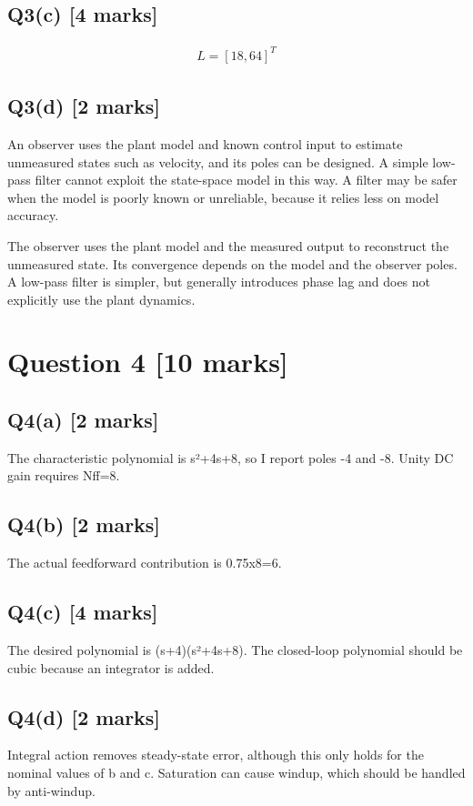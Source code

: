 \documentclass[11pt,a4paper]{article}
\begin{document}
\subsection*{Q3(c) \hfill [4 marks]}

\[\begin{aligned}L = [18,64]^T\end{aligned}\]

\subsection*{Q3(d) \hfill [2 marks]}

An observer uses the plant model and known control input to estimate unmeasured states such as velocity, and its poles can be designed.
A simple low-pass filter cannot exploit the state-space model in this way.
A filter may be safer when the model is poorly known or unreliable, because it relies less on model accuracy.\par\smallskip The observer uses the plant model and the measured output to reconstruct the unmeasured state. Its convergence depends on the model and the observer poles. A low-pass filter is simpler, but generally introduces phase lag and does not explicitly use the plant dynamics.

\section*{Question 4 \hfill [10 marks]}
\subsection*{Q4(a) \hfill [2 marks]}

The characteristic polynomial is s²+4s+8, so I report poles -4 and -8.
Unity DC gain requires Nff=8.

\subsection*{Q4(b) \hfill [2 marks]}

The actual feedforward contribution is 0.75x8=6.

\subsection*{Q4(c) \hfill [4 marks]}

The desired polynomial is (s+4)(s²+4s+8).
The closed-loop polynomial should be cubic because an integrator is added.

\subsection*{Q4(d) \hfill [2 marks]}

Integral action removes steady-state error, although this only holds for the nominal values of b and c.
Saturation can cause windup, which should be handled by anti-windup.
\end{document}
